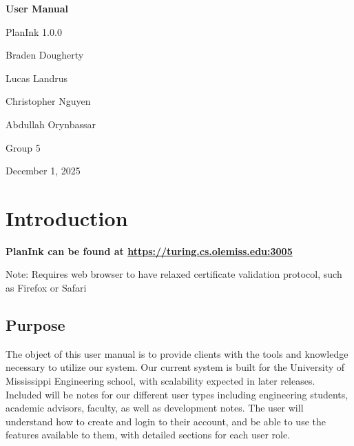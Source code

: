 \documentclass[12pt,letterpaper]{article}
\begin{document}
\begin{titlepage}
    \centering
    \vspace*{2cm}
    
    {\Huge\bfseries User Manual\par}
    \vspace{0.5cm}
    {\LARGE PlanInk 1.0.0\par}
    \vspace{2cm}
    
    {\Large Braden Dougherty\par}
    {\Large Lucas Landrus\par}
    {\Large Christopher Nguyen\par}
    {\Large Abdullah Orynbassar\par}
    \vspace{1cm}
    {\large Group 5\par}
    
    \vfill
    
    {\large December 1, 2025\par}
\end{titlepage}

\tableofcontents
\newpage

\section{Introduction}

\begin{center}\textbf{PlanInk can be found at \url{https://turing.cs.olemiss.edu:3005}}
\end{center}

\noindent Note: Requires web browser to have relaxed certificate validation protocol, such as Firefox or Safari


\subsection{Purpose}

The object of this user manual is to provide clients with the tools and knowledge necessary to utilize our system. Our current system is built for the University of Mississippi Engineering school, with scalability expected in later releases. Included will be notes for our different user types including engineering students, academic advisors, faculty, as well as development notes. The user will understand how to create and login to their account, and be able to use the features available to them, with detailed sections for each user role.
\end{document}
